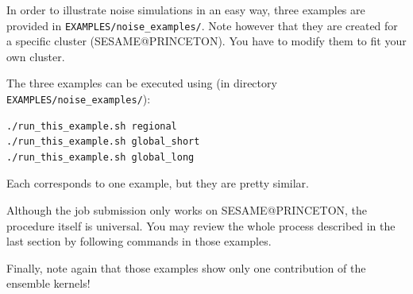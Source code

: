 In order to illustrate noise simulations in an easy way, three examples are provided in
\texttt{EXAMPLES/noise\_examples/}.
Note however that they are created for a specific cluster (SESAME@PRINCETON).
You have to modify them to fit your own cluster.

The three examples can be executed using (in directory \texttt{EXAMPLES/noise\_examples/}):
\begin{verbatim}
./run_this_example.sh regional
./run_this_example.sh global_short
./run_this_example.sh global_long
\end{verbatim}

Each corresponds to one example, but they are pretty similar.

Although the job submission only works on SESAME@PRINCETON, the procedure itself is universal.
You may review the whole process described in the last section by following commands in those examples.

Finally, note again that those examples show only one contribution of the ensemble kernels!




